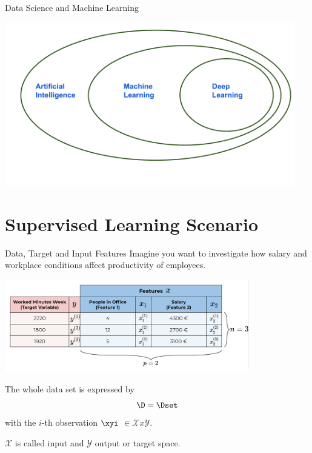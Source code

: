 \begin{frame}{Data Science and Machine Learning}

\scriptsize

\begin{center}
\includegraphics[width=0.95\textwidth]{plots/learning.pdf} 
\end{center}

\normalsize 

\end{frame}


\section{Supervised Learning Scenario}

\begin{frame}{Data, Target and Input Features}
Imagine you want to investigate how salary and workplace conditions affect productivity of employees.

\scriptsize

\begin{center}\includegraphics[width=0.8\textwidth]{plots/data_table} \end{center}

\normalsize 

\vspace{-0.5cm}

The whole data set is expressed by \[
\D = \Dset
\] with the \(i\)-th observation \(\xyi\) $\in \mathcal{X}x\mathcal{Y}$.

$\mathcal{X}$ is called input and $\mathcal{Y}$ output or target space.

\end{frame}


